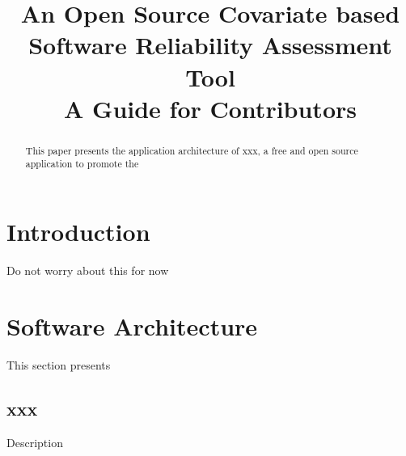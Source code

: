 \documentclass[conference]{IEEEtran}
\begin{document}
\title{An Open Source Covariate based Software Reliability Assessment Tool \\
	 A Guide for Contributors}

\author{
}

\maketitle

\begin{abstract}%
This paper presents the application architecture of xxx, a free and open source application to promote the
\end{abstract}



\section{Introduction}\label{sec:Intro}
Do not worry about this for now



\section{Software Architecture}\label{sec:Architecture}
This section presents

\subsection{xxx}\label{sec:Tab1}
Description
\end{document}
